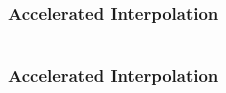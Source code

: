 \begin{frame}[t]
	\frametitle{Accelerated Interpolation}
	\begin{columns}
		\begin{column}{0.35\textwidth}
			\resizebox{0.8\textwidth}{!}{}
		\end{column}
		\begin{column}{0.55\textwidth}
			\resizebox{0.4\textwidth}{!}{}
		\end{column}
	\end{columns}
\end{frame}

\begin{frame}[t]
	\frametitle{Accelerated Interpolation}
	\begin{columns}
		\begin{column}{0.3\textwidth}
			\resizebox{0.8\textwidth}{!}{}
		\end{column}
		\begin{column}{0.35\textwidth}
				\resizebox{\textwidth}{!}{}
		\end{column}
		\begin{column}{0.3\textwidth}
				\onslide<9->{\resizebox{0.65\textwidth}{!}{}}
		\end{column}
	\end{columns}
	\begin{center}
	\end{center}
\end{frame}

